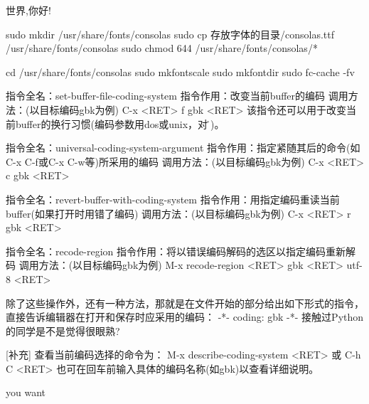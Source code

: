 \documentclass[11pt,a4paper]{article}
\begin{document}
世界,你好!

      sudo mkdir /usr/share/fonts/consolas
      sudo cp 存放字体的目录/consolas.ttf  /usr/share/fonts/consolas
      sudo chmod 644 /usr/share/fonts/consolas/* 

      cd /usr/share/fonts/consolas
      sudo mkfontscale
      sudo mkfontdir 
      sudo fc-cache -fv 

指令全名：set-buffer-file-coding-system
指令作用：改变当前buffer的编码
调用方法：(以目标编码gbk为例)
C-x <RET> f gbk <RET>
该指令还可以用于改变当前buffer的换行习惯(编码参数用dos或unix，对应\r{}\n)。

指令全名：universal-coding-system-argument
指令作用：指定紧随其后的命令(如C-x C-f或C-x C-w等)所采用的编码
调用方法：(以目标编码gbk为例)
C-x <RET> c gbk <RET>

指令全名：revert-buffer-with-coding-system
指令作用：用指定编码重读当前buffer(如果打开时用错了编码)
调用方法：(以目标编码gbk为例)
C-x <RET> r gbk <RET>

指令全名：recode-region
指令作用：将以错误编码解码的选区以指定编码重新解码
调用方法：(以目标编码gbk为例)
M-x recode-region <RET> gbk <RET> utf-8 <RET>

除了这些操作外，还有一种方法，那就是在文件开始的部分给出如下形式的指令，直接告诉编辑器在打开和保存时应采用的编码：
-*- coding: gbk -*-
接触过Python的同学是不是觉得很眼熟?

[补充] 查看当前编码选择的命令为：
M-x describe-coding-system <RET> 或 C-h C <RET>
也可在回车前输入具体的编码名称(如gbk)以查看详细说明。


 you want
\end{document}

